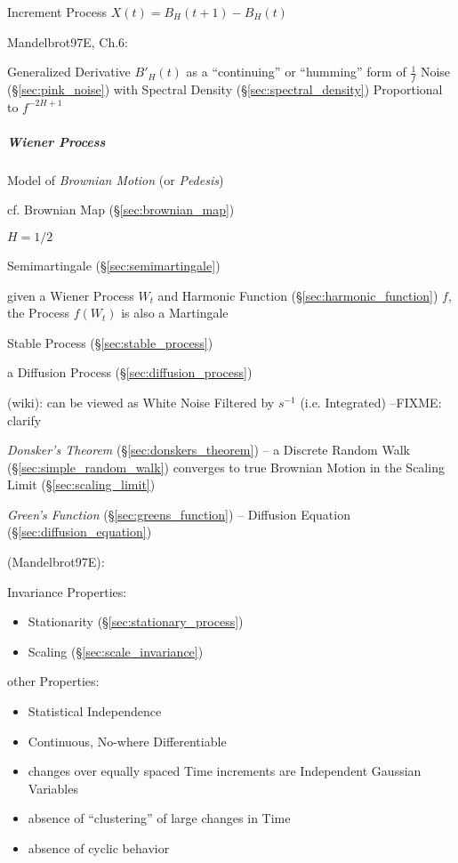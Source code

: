 Increment Process $X(t) = B_H(t+1) - B_H(t)$

Mandelbrot97E, Ch.6:

Generalized Derivative $B'_H(t)$ as a ``continuing'' or ``humming'' form of
$\frac{1}{f}$ Noise (\S\ref{sec:pink_noise}) with Spectral Density
(\S\ref{sec:spectral_density}) Proportional to $f^{-2H+1}$



\subparagraph{Wiener Process}\label{sec:wiener_process}\hfill

Model of \emph{Brownian Motion} (or \emph{Pedesis})

\fist cf. Brownian Map (\S\ref{sec:brownian_map})

$H = 1/2$

Semimartingale (\S\ref{sec:semimartingale})

given a Wiener Process $W_t$ and Harmonic Function
(\S\ref{sec:harmonic_function}) $f$, the Process $f(W_t)$ is also a Martingale

Stable Process (\S\ref{sec:stable_process})

a Diffusion Process (\S\ref{sec:diffusion_process})

(wiki):
can be viewed as White Noise Filtered by $s^{-1}$ (i.e. Integrated)
--FIXME: clarify

\emph{Donsker's Theorem} (\S\ref{sec:donskers_theorem}) -- a Discrete Random
Walk (\S\ref{sec:simple_random_walk}) converges to true Brownian Motion in the
Scaling Limit (\S\ref{sec:scaling_limit})

\emph{Green's Function} (\S\ref{sec:greens_function}) -- Diffusion Equation
(\S\ref{sec:diffusion_equation})

(Mandelbrot97E):

Invariance Properties:
\begin{itemize}
  \item Stationarity (\S\ref{sec:stationary_process})
  \item Scaling (\S\ref{sec:scale_invariance})
\end{itemize}

other Properties:
\begin{itemize}
  \item Statistical Independence
  \item Continuous, No-where Differentiable
  \item changes over equally spaced Time increments are Independent Gaussian
    Variables
  \item absence of ``clustering'' of large changes in Time
  \item absence of cyclic behavior
\end{itemize}

